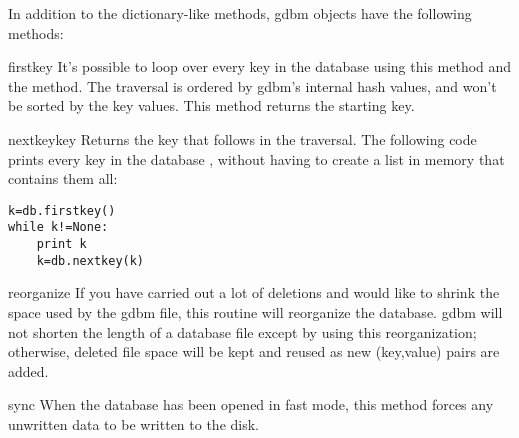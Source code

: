 In addition to the dictionary-like methods, {\sc gdbm} objects have the
following methods:

\begin{funcdesc}{firstkey}{}
It's possible to loop over every key in the database using this method
and the  method.  The traversal is ordered by {\sc gdbm}'s
internal hash values, and won't be sorted by the key values.  This
method returns the starting key.
\end{funcdesc}

\begin{funcdesc}{nextkey}{key}
Returns the key that follows  in the traversal.  The
following code prints every key in the database , without having to
create a list in memory that contains them all:
\bcode\begin{verbatim}
k=db.firstkey()
while k!=None:
    print k
    k=db.nextkey(k)
\end{verbatim}\ecode
\end{funcdesc}

\begin{funcdesc}{reorganize}{}
If you have carried out a lot of deletions and would like to shrink
the space used by the {\sc gdbm} file, this routine will reorganize the
database.  {\sc gdbm} will not shorten the length of a database file except
by using this reorganization; otherwise, deleted file space will be
kept and reused as new (key,value) pairs are added.
\end{funcdesc}

\begin{funcdesc}{sync}{}
When the database has been opened in fast mode, this method forces any
unwritten data to be written to the disk.
\end{funcdesc}

